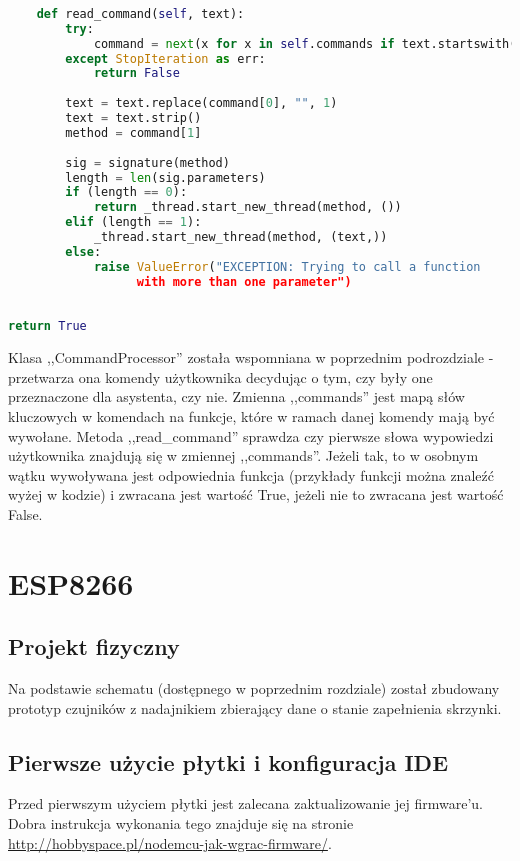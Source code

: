\begin{lstlisting}[language=Python]
	
    def read_command(self, text):
        try:
            command = next(x for x in self.commands if text.startswith(x[0]))
        except StopIteration as err:
            return False
        
        text = text.replace(command[0], "", 1)
        text = text.strip()
        method = command[1]
           
        sig = signature(method)
        length = len(sig.parameters)
        if (length == 0):
            return _thread.start_new_thread(method, ())
        elif (length == 1):
            _thread.start_new_thread(method, (text,))
        else:
            raise ValueError("EXCEPTION: Trying to call a function
			      with more than one parameter") 
        
        
return True


\end{lstlisting} 

Klasa ,,CommandProcessor'' została wspomniana w poprzednim podrozdziale - przetwarza ona komendy użytkownika decydując o tym, czy były one przeznaczone dla 
asystenta, czy nie. Zmienna ,,commands'' jest mapą słów kluczowych w komendach
na funkcje, które w ramach danej komendy mają być wywołane. Metoda ,,read\_command'' sprawdza czy pierwsze słowa wypowiedzi użytkownika 
znajdują się w zmiennej ,,commands''. Jeżeli tak, to w osobnym wątku wywoływana jest odpowiednia funkcja (przykłady funkcji można znaleźć wyżej w kodzie)
i zwracana jest wartość True, jeżeli nie to zwracana jest wartość False.

\section{ESP8266}

\subsection{Projekt fizyczny}

Na podstawie schematu (dostępnego w poprzednim rozdziale) został zbudowany prototyp czujników z nadajnikiem zbierający dane o stanie zapełnienia skrzynki.

\subsection{Pierwsze użycie płytki i konfiguracja IDE}

Przed pierwszym użyciem płytki jest zalecana zaktualizowanie jej firmware'u. Dobra instrukcja wykonania tego znajduje się na stronie \url{http://hobbyspace.pl/nodemcu-jak-wgrac-firmware/}.

